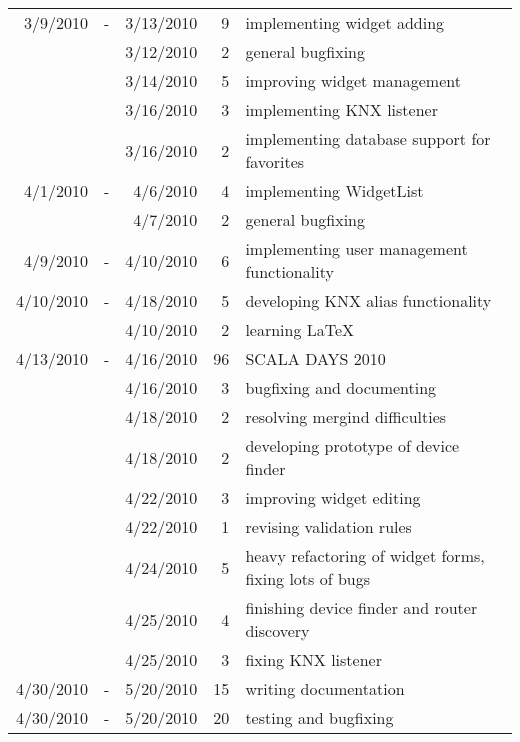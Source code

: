\begin{tabular}{| r c r | r | l |}
3/9/2010	&	-	&	3/13/2010	&	9	&	implementing widget adding \\
	&		&	3/12/2010	&	2	&	general bugfixing \\
	&		&	3/14/2010	&	5	&	improving widget management \\
	&		&	3/16/2010	&	3	&	implementing KNX listener \\
	&		&	3/16/2010	&	2	&	implementing database support for favorites \\
4/1/2010	&	-	&	4/6/2010	&	4	&	implementing WidgetList\\
	&		&	4/7/2010	&	2	&	general bugfixing \\
4/9/2010	&	-	&	4/10/2010	&	6	&	implementing user management functionality\\
4/10/2010	&	-	&	4/18/2010	&	5	&	developing KNX alias functionality \\
	&		&	4/10/2010	&	2	&	learning LaTeX \\
4/13/2010	&	-	&	4/16/2010	&	96	&	SCALA DAYS 2010 \\
	&		&	4/16/2010	&	3	&	bugfixing and documenting \\
	&		&	4/18/2010	&	2	&	resolving mergind difficulties \\
	&		&	4/18/2010	&	2	&	developing prototype of device finder \\
	&		&	4/22/2010	&	3	&	improving widget editing \\
	&		&	4/22/2010	&	1	&	revising validation rules \\
	&		&	4/24/2010	&	5	&	heavy refactoring of widget forms, fixing lots of bugs\\
	&		&	4/25/2010	&	4	&	finishing device finder and router discovery \\
	&		&	4/25/2010	&	3	&	fixing KNX listener \\
4/30/2010	&	-	&	5/20/2010	&	15	&	writing documentation \\
4/30/2010	&	-	&	5/20/2010	&	20	&	testing and bugfixing \\
\hline
\end{tabular}

